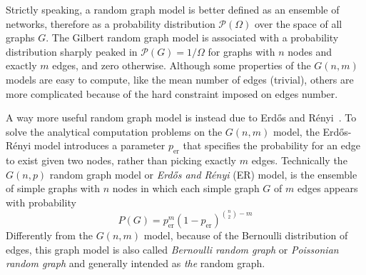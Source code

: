 Strictly speaking, a random graph model is better defined as an ensemble of networks, therefore as a probability distribution $\mathcal{P}(\Omega)$ over the space of all graphs $G$.
The Gilbert random graph model is associated with a probability distribution sharply peaked in $\mathcal{P}(G)=1/\Omega$ for graphs with $n$ nodes and exactly $m$ edges, and zero otherwise.
Although some properties of the $G(n,m)$ models are easy to compute, like the mean number of edges (trivial), others are more complicated because of the hard constraint imposed on edges number.

A way more useful random graph model is instead due to Erd\H{o}s and Rényi~\cite{erdos1959}.
To solve the analytical computation problems on the $G(n,m)$ model, the Erd\H{o}s-Rényi model introduces a parameter $p_{\textrm{er}}$ that specifies the probability for an edge to exist given two nodes, rather than picking exactly $m$ edges.
Technically the $G(n,p)$ random graph model or \emph{Erd\H{o}s and Rényi} (ER) model, is the ensemble of simple graphs with $n$ nodes in which each simple graph $G$ of $m$ edges appears with probability
\begin{equation}
P(G)={p}_{\textrm{er}}^{m}(1-p_{\textrm{er}})^{\binom{n}{2}-m}
\end{equation}
Differently from the $G(n,m)$ model, because of the Bernoulli distribution of edges, this graph model is also called \emph{Bernoulli random graph} or \emph{Poissonian random graph} and generally intended as \emph{the} random graph.

